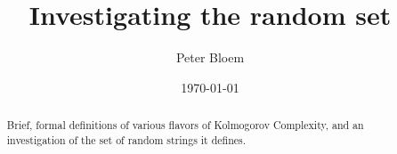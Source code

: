 \documentclass{article}
\title{Investigating the random set}
\date{\today}
\author{Peter Bloem}
\begin{document}
\maketitle

\begin{abstract}
\noindent Brief, formal definitions of various flavors of Kolmogorov Complexity, and an investigation of the set of random strings it defines.
\end{abstract}
\end{document}
